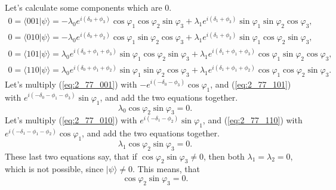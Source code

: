 \documentclass[a4paper,12pt]{article}
\newcommand{\la}{\langle}
\newcommand{\ra}{\rangle}
\begin{document}
    Let's calculate some components which are 0.
    \begin{gather}
        \label{eq:2_77_001}
        0 = \la 001 | \psi \ra =
        -\lambda_0 e^{i(\delta_0 + \phi_3)} \cos \varphi_1 \cos \varphi_2 \sin \varphi_3
        +\lambda_1 e^{i(\delta_1 + \phi_3)} \sin \varphi_1 \sin \varphi_2 \cos \varphi_3 \textrm{,} \\
        \label{eq:2_77_010}
        0 = \la 010 | \psi \ra =
        -\lambda_0 e^{i(\delta_0 + \phi_2)} \cos \varphi_1 \sin \varphi_2 \cos \varphi_3
        +\lambda_1 e^{i(\delta_1 + \phi_2)} \sin \varphi_1 \cos \varphi_2 \sin \varphi_3 \textrm{,} \\
        \label{eq:2_77_101}
        0 = \la 101 | \psi \ra =
        \lambda_0 e^{i(\delta_0+\phi_1+\phi_3)} \sin \varphi_1 \cos \varphi_2 \sin \varphi_3
        +\lambda_1 e^{i(\delta_1+\phi_1+\phi_3)} \cos \varphi_1 \sin \varphi_2 \cos \varphi_3 \textrm{,} \\
        \label{eq:2_77_110}
        0 = \la 110 | \psi \ra =
        \lambda_0 e^{i(\delta_0+\phi_1+\phi_2)} \sin \varphi_1 \sin \varphi_2 \cos \varphi_3
        +\lambda_1 e^{i(\delta_1+\phi_1+\phi_2)} \cos \varphi_1 \cos \varphi_2 \sin \varphi_3 \textrm{.}
    \end{gather}
    Let's multiply (\ref{eq:2_77_001}) with $-e^{i(-\delta_0-\phi_3)} \cos \varphi_1$, and (\ref{eq:2_77_101}) with $e^{i(-\delta_0-\phi_1-\phi_3)} \sin \varphi_1$, and add the two equations together.
    \begin{equation}
        \lambda_0 \cos \varphi_2 \sin \varphi_3 = 0 \textrm{.}
    \end{equation}
    Let's multiply (\ref{eq:2_77_010}) with $e^{i(-\delta_1-\phi_2)} \sin \varphi_1$, and (\ref{eq:2_77_110}) with $e^{i(-\delta_1-\phi_1-\phi_2)} \cos \varphi_1$, and add the two equations together.
    \begin{equation}
        \lambda_1 \cos \varphi_2 \sin \varphi_3 = 0 \textrm{.}
    \end{equation}
    These last two equations say, that if $\cos \varphi_2 \sin \varphi_3 \neq 0$, then both $\lambda_1 = \lambda_2 = 0$, which is not possible, since $| \psi \ra \neq 0$. This means, that
    \begin{equation}
        \cos \varphi_2 \sin \varphi_3 = 0 \textrm{.}
    \end{equation}
\end{document}
